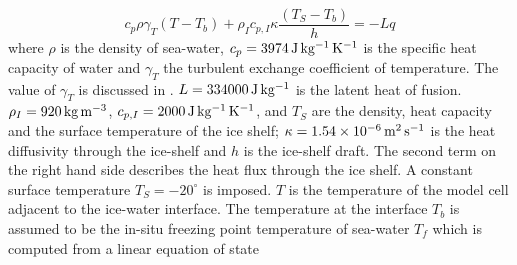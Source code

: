 \begin{equation}
  \label{eq:hellmerheatbalance}
  c_{p} \rho \gamma_T (T - T_{b})
  +\rho_{I} c_{p,I} \kappa \frac{(T_{S} - T_{b})}{h}
  = -Lq 
\end{equation}
where %
$\rho$ is the density of sea-water, %
$c_{p} = 3974\text{\,J\,kg$^{-1}$\,K$^{-1}$}$ is the specific heat
capacity of water and %
$\gamma_T$ the turbulent exchange coefficient of temperature. %
The value of $\gamma_T$ is discussed in \citet{holland99}.  $L =
334000\text{\,J\,kg$^{-1}$}$ is the latent heat of fusion. $\rho_{I} =
920\text{\,kg\,m$^{-3}$}$, $c_{p,I} =
2000\text{\,J\,kg$^{-1}$\,K$^{-1}$}$, and $T_{S}$ are the density,
heat capacity and the surface temperature of the ice shelf;
$\kappa=1.54\times10^{-6}\text{\,m$^2$\,s$^{-1}$}$ is the heat
diffusivity through the ice-shelf and $h$ is the ice-shelf draft. The
second term on the right hand side describes the heat flux through the
ice shelf. A constant surface temperature $T_S=-20^{\circ}$ is
imposed.  $T$ is the temperature of the model cell adjacent to the
ice-water interface. The temperature at the interface $T_{b}$ is
assumed to be the in-situ freezing point temperature of sea-water
$T_{f}$ which is computed from a linear equation of state

